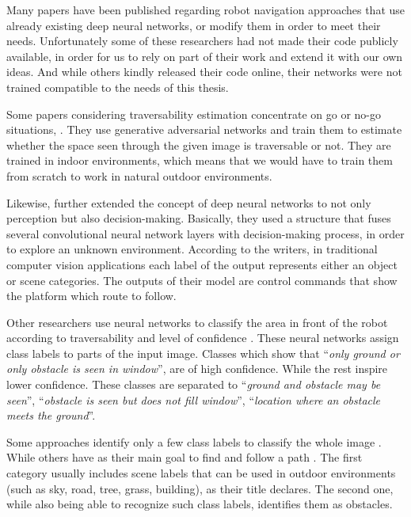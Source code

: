 \documentclass[12pt,a4paper,table,dvipsnames,tikz]{report}
\newcommand{\defn}[1]{\enquote{\textit{#1}}}
\begin{document}
	Many papers have been published regarding robot navigation approaches that use 
	already existing deep neural networks, or modify them in order to meet their needs.
	Unfortunately some of these researchers had not made their code publicly available, 
	in order for us to rely on part of their work and extend it with our own ideas. And 
	while others kindly released their code online, their networks were not trained 
	compatible to the needs of this thesis.
	\par
	Some papers considering traversability estimation concentrate on go or no-go situations, 
	\citep{HiroseGonet, HiroseVunet}. They use generative adversarial networks and train 
	them to estimate whether the space seen through the given image is traversable or not. 
	They are trained in indoor environments, which means that we would have to train them 
	from scratch to work in natural outdoor environments.
	\par
	Likewise, \citet{Tai} further extended the concept of deep neural networks to not only 
	perception but also decision-making. Basically, they used a structure that fuses several 
	convolutional neural network layers with decision-making process, in order to explore 
	an unknown environment. According to the writers, in traditional computer vision 
	applications each label of the output represents either an object or scene categories. 
	The outputs of their model are control commands that show the platform which route to 
	follow.
	\par
	Other researchers use neural networks to classify the area in front of the robot 
	according to traversability and level of confidence \citep{Sermanet, Hadsell}. These 
	neural networks assign class labels to parts of the input image. Classes which show 
	that \defn{only ground or only obstacle is seen in window}, are of high confidence. 
	While the rest inspire lower confidence. These classes are separated to 
	\defn{ground and obstacle may be seen}, \defn{obstacle is seen but does not fill window}, 
	\defn{location where an obstacle meets the ground}.
	\par
	Some approaches identify only a few class labels to classify the whole image 
	\citep{Holder, Bosch, Farabet}. While others have as their main goal to find and follow 
	a path \citep{Yang, Orsic}. The first category usually includes scene labels that can 
	be used in outdoor environments (such as sky, road, tree, grass, building), as their 
	title declares. The second one, while also being able to recognize such class labels, 
	identifies them as obstacles.
	\\
	
\end{document}

